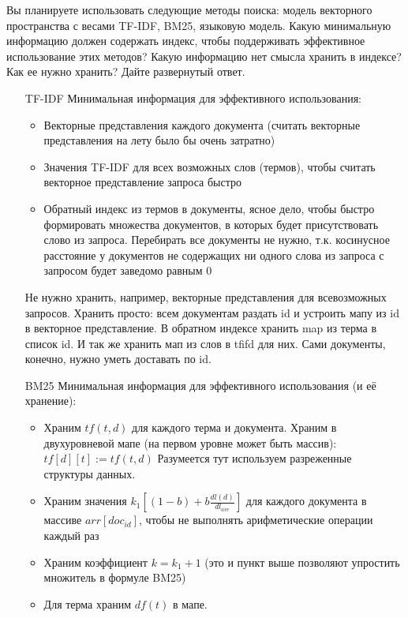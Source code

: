 \begin{task}[3]
Вы планируете использовать следующие методы поиска: модель векторного
пространства с весами TF-IDF, BM25, языковую модель. Какую минимальную
информацию должен содержать индекс, чтобы поддерживать эффективное использование
этих методов? Какую информацию нет смысла хранить в индексе? Как ее нужно
хранить? Дайте развернутый ответ.
\end{task}
\begin{solution}
\begin{itemize}
	\item[TF-IDF] Минимальная информация для эффективного использования:
	\begin{itemize}
		\item Векторные представления каждого документа (считать векторные представления на лету было бы очень затратно)
		\item Значения TF-IDF для всех возможных слов (термов), чтобы считать векторное представление запроса быстро
		\item Обратный индекс из термов в документы, ясное дело, чтобы быстро формировать множества документов, в которых будет присутствовать слово из запроса. Перебирать все документы не нужно, т.к. косинусное расстояние у документов не содержащих ни одного слова из запроса с запросом будет заведомо равным 0
	\end{itemize}
	Не нужно хранить, например, векторные представления для всевозможных запросов.
	Хранить просто: всем документам раздать id и устроить мапу из id в векторное представление. В обратном индексе хранить map из терма в список id. И так же хранить мап из слов в tfifd для них.
	Сами документы, конечно, нужно уметь доставать по id.
	\item[BM25] Минимальная информация для эффективного использования (и её хранение):
	\begin{itemize}
		\item Храним $tf(t, d)$ для каждого терма и документа. Храним в двухуровневой мапе (на первом уровне может быть массив): $tf[d][t] := tf(t, d)$ Разумеется тут используем разреженные структуры данных.
		\item Храним значения $k_1 [(1-b) + b \frac{dl(d)}{dl_{ave}}]$ для каждого документа в массиве $arr[doc_{id}]$, чтобы не выполнять арифметические операции каждый раз
		\item Храним коэффициент $k = k_1 + 1$ (это и пункт выше позволяют упростить множитель в формуле BM25)
		\item Для терма храним $df(t)$ в мапе.

\end{itemize}
\end{itemize}
\end{solution}
